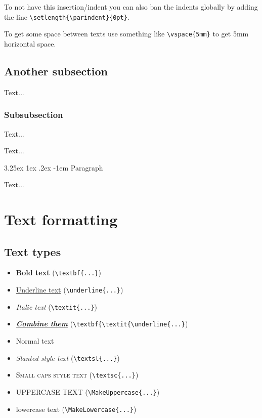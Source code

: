\documentclass{article}				%
\makeatletter
\newcounter{subsubsubsection}[subsubsection]
\renewcommand\paragraph{\@startsection{paragraph}{5}{\z@}%
	{3.25ex \@plus1ex \@minus.2ex}%
	{-1em}%
	{\normalfont\normalsize\bfseries}}
\makeatother
\begin{document}
To not have this insertion/indent you can also ban the indents globally by adding the line \verb|\setlength{\parindent}{0pt}|.

\vspace{5mm} %

To get some space between texts use something like \verb|\vspace{5mm}| to get 5mm horizontal space.


\subsection{Another subsection}

Text...

\subsubsection{Subsubsection}

Text...


Text...

\paragraph{Paragraph}

Text...

\section{Text formatting}
\label{sec:exampleAnchor}

\subsection{Text types}

\begin{itemize}
	\item \textbf{Bold text} (\verb|\textbf{...}|)
	\item \underline{Underline text} (\verb|\underline{...}|)
	\item \textit{Italic text} (\verb|\textit{...}|)
	\item \textbf{\textit{\underline{Combine them}}} (\verb|\textbf{\textit{\underline{...}|)
	\item Normal text
	\item \textsl{Slanted style text} (\verb|\textsl{...}|)
	\item \textsc{Small caps style text} (\verb|\textsc{...}|)
	\item \MakeUppercase{uppeRcase text} (\verb|\MakeUppercase{...}|)
	\item \MakeLowercase{LOWERcASE tExT} (\verb|\MakeLowercase{...}|)
\end{itemize}
\end{document}
